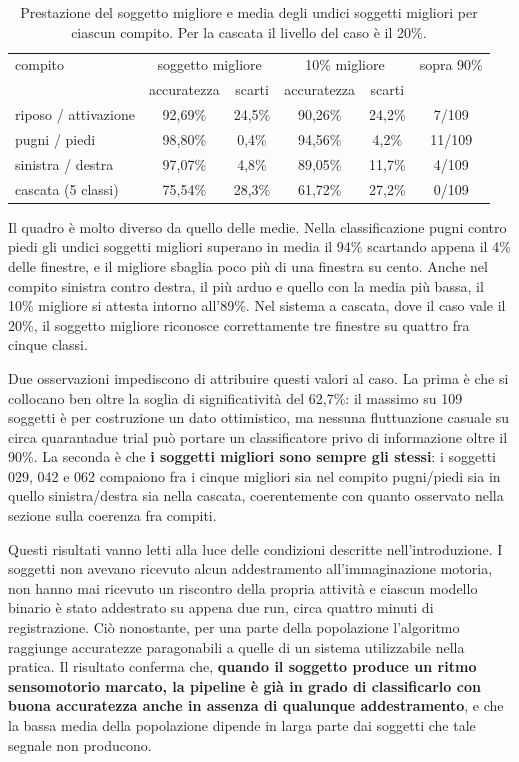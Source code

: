 \begin{table}[htbp]
\centering
\begin{tabular}{lccccc}
\toprule
compito & \multicolumn{2}{c}{soggetto migliore} & \multicolumn{2}{c}{10\% migliore} & sopra 90\% \\
 & accuratezza & scarti & accuratezza & scarti & \\
\midrule
riposo / attivazione & 92,69\% & 24,5\% & 90,26\% & 24,2\% & 7/109 \\
pugni / piedi        & 98,80\% &  0,4\% & 94,56\% &  4,2\% & 11/109 \\
sinistra / destra    & 97,07\% &  4,8\% & 89,05\% & 11,7\% & 4/109 \\
cascata (5 classi)   & 75,54\% & 28,3\% & 61,72\% & 27,2\% & 0/109 \\
\bottomrule
\end{tabular}
\caption{Prestazione del soggetto migliore e media degli undici soggetti migliori per ciascun compito. Per la cascata il livello del caso è il 20\%.}
\label{tab:migliori}
\end{table}

Il quadro è molto diverso da quello delle medie. Nella classificazione pugni contro piedi gli undici soggetti migliori superano in media il 94\% scartando appena il 4\% delle finestre, e il migliore sbaglia poco più di una finestra su cento. Anche nel compito sinistra contro destra, il più arduo e quello con la media più bassa, il 10\% migliore si attesta intorno all'89\%. Nel sistema a cascata, dove il caso vale il 20\%, il soggetto migliore riconosce correttamente tre finestre su quattro fra cinque classi.

Due osservazioni impediscono di attribuire questi valori al caso. La prima è che si collocano ben oltre la soglia di significatività del 62,7\%: il massimo su 109 soggetti è per costruzione un dato ottimistico, ma nessuna fluttuazione casuale su circa quarantadue trial può portare un classificatore privo di informazione oltre il 90\%. La seconda è che \textbf{i soggetti migliori sono sempre gli stessi}: i soggetti 029, 042 e 062 compaiono fra i cinque migliori sia nel compito pugni/piedi sia in quello sinistra/destra sia nella cascata, coerentemente con quanto osservato nella sezione sulla coerenza fra compiti.

Questi risultati vanno letti alla luce delle condizioni descritte nell'introduzione. I soggetti non avevano ricevuto alcun addestramento all'immaginazione motoria, non hanno mai ricevuto un riscontro della propria attività e ciascun modello binario è stato addestrato su appena due run, circa quattro minuti di registrazione. Ciò nonostante, per una parte della popolazione l'algoritmo raggiunge accuratezze paragonabili a quelle di un sistema utilizzabile nella pratica. Il risultato conferma che, \textbf{quando il soggetto produce un ritmo sensomotorio marcato, la pipeline è già in grado di classificarlo con buona accuratezza anche in assenza di qualunque addestramento}, e che la bassa media della popolazione dipende in larga parte dai soggetti che tale segnale non producono.

